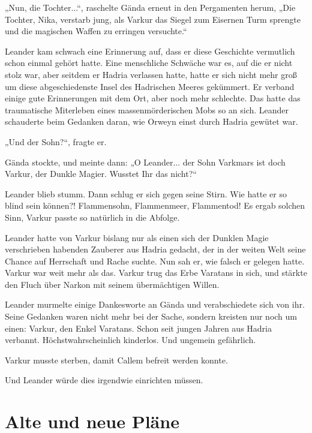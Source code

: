 \documentclass[10pt, a4paper, oneside]{book}
\begin{document}
„Nun, die Tochter...“, raschelte Gända erneut in den Pergamenten herum, „Die Tochter, Nika, verstarb jung, als Varkur das Siegel zum Eisernen Turm sprengte und die magischen Waffen zu erringen versuchte.“

Leander kam schwach eine Erinnerung auf, dass er diese Geschichte vermutlich schon einmal gehört hatte. Eine menschliche Schwäche war es, auf die er nicht stolz war, aber seitdem er Hadria verlassen hatte, hatte er sich nicht mehr groß um diese abgeschiedenste Insel des Hadrischen Meeres gekümmert. Er verband einige gute Erinnerungen mit dem Ort, aber noch mehr schlechte. Das hatte das traumatische Miterleben eines massenmörderischen Mobs so an sich. Leander schauderte beim Gedanken daran, wie Orweyn einst durch Hadria gewütet war.

„Und der Sohn?“, fragte er.

Gända stockte, und meinte dann: „O Leander... der Sohn Varkmars ist doch Varkur, der Dunkle Magier. Wusstet Ihr das nicht?“

Leander blieb stumm. Dann schlug er sich gegen seine Stirn. Wie hatte er so blind sein können?! Flammensohn, Flammenmeer, Flammentod! Es ergab solchen Sinn, Varkur passte so natürlich in die Abfolge.

Leander hatte von Varkur bislang nur als einen sich der Dunklen Magie verschrieben habenden Zauberer aus Hadria gedacht, der in der weiten Welt seine Chance auf Herrschaft und Rache suchte. Nun sah er, wie falsch er gelegen hatte. Varkur war weit mehr als das. Varkur trug das Erbe Varatans in sich, und stärkte den Fluch über Narkon mit seinem übermächtigen Willen.

Leander murmelte einige Dankesworte an Gända und verabschiedete sich von ihr. Seine Gedanken waren nicht mehr bei der Sache, sondern kreisten nur noch um einen: Varkur, den Enkel Varatans. Schon seit jungen Jahren aus Hadria verbannt. Höchstwahrscheinlich kinderlos. Und ungemein gefährlich.

Varkur musste sterben, damit Callem befreit werden konnte.

Und Leander würde dies irgendwie einrichten müssen.








\newpage
\section{Alte und neue Pläne}
\end{document}
